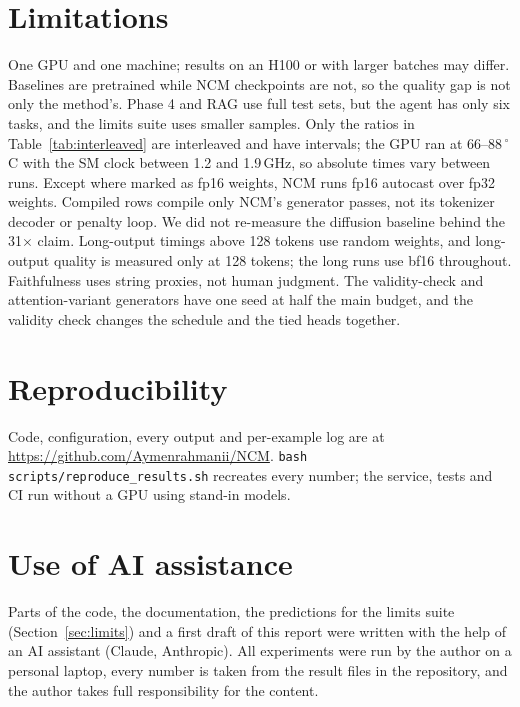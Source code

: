 \documentclass[11pt]{article}
\begin{document}
\section{Limitations}
One GPU and one machine; results on an H100 or with larger batches may differ. Baselines are
pretrained while NCM checkpoints are not, so the quality gap is not only the method's.
Phase 4 and RAG use full test sets, but the agent has only six tasks, and the limits suite
uses smaller samples. Only the ratios in Table~\ref{tab:interleaved} are interleaved and
have intervals; the GPU ran at 66--88\,$^\circ$C with the SM clock between 1.2 and 1.9\,GHz,
so absolute times vary between runs. Except where marked as fp16 weights, NCM runs fp16 autocast over fp32 weights. Compiled rows compile only NCM's generator passes, not its tokenizer decoder or penalty loop. We did not re-measure the diffusion baseline behind the
31$\times$ claim. Long-output timings above 128 tokens use random weights, and long-output
quality is measured only at 128 tokens; the long runs use bf16 throughout. Faithfulness uses string proxies, not human judgment. The validity-check and attention-variant generators have one seed at half the main budget, and the validity check changes the schedule and the tied heads together.

\section{Reproducibility}
Code, configuration, every output and per-example log are at
\url{https://github.com/Aymenrahmanii/NCM}. \texttt{bash scripts/reproduce\_results.sh}
recreates every number; the service, tests and CI run without a GPU using stand-in models.

\section*{Use of AI assistance}
Parts of the code, the documentation, the predictions for the limits suite
(Section~\ref{sec:limits}) and a first draft of this report were written with the help of an
AI assistant (Claude, Anthropic). All experiments were run by the author on a personal laptop,
every number is taken from the result files in the repository, and the author takes full
responsibility for the content.



\end{document}
